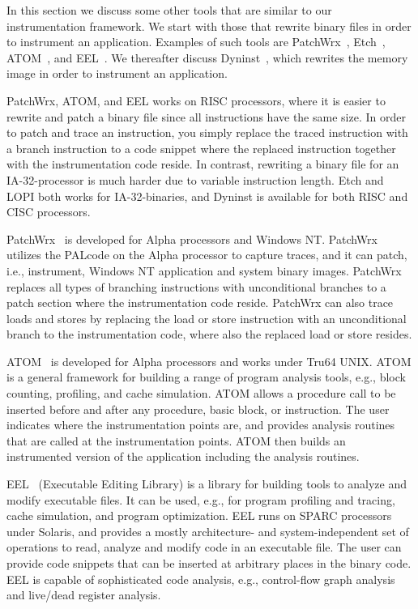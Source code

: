 \label{sec:lopi:related_work}
In this section we discuss some other tools that are similar to our
instrumentation framework. We start with those that rewrite binary files in
order to instrument an application. Examples of such tools are
PatchWrx~\cite{casmira98tcw}, Etch~\cite{etch}, ATOM~\cite{atom}, and
EEL~\cite{eel}. We thereafter discuss Dyninst~\cite{buck00dyninst, paradyn95},
which rewrites the memory image in order to instrument an application.

PatchWrx, ATOM, and EEL works on RISC processors, where it is easier to
rewrite and patch a binary file since all instructions have the same size. In
order to patch and trace an instruction, you simply replace the traced
instruction with a branch instruction to a code snippet where the replaced
instruction together with the instrumentation code reside. In contrast,
rewriting a binary file for an IA-32-processor is much harder due to variable
instruction length. Etch and LOPI both works for IA-32-binaries, and Dyninst
is available for both RISC and CISC processors.

PatchWrx~\cite{casmira98tcw} is developed for Alpha processors and Windows
NT. PatchWrx utilizes the PALcode on the Alpha processor to capture traces,
and it can patch, i.e., instrument, Windows NT application and system binary
images. PatchWrx replaces all types of branching instructions with
unconditional branches to a patch section where the instrumentation code
reside. PatchWrx can also trace loads and stores by replacing the load or
store instruction with an unconditional branch to the instrumentation code,
where also the replaced load or store resides.

ATOM~\cite{atom} is developed for Alpha processors and works under Tru64 UNIX.
ATOM is a general framework for building a range of program analysis tools,
e.g., block counting, profiling, and cache simulation. ATOM allows a procedure
call to be inserted before and after any procedure, basic block, or
instruction. The user indicates where the instrumentation points are, and
provides analysis routines that are called at the instrumentation points.
ATOM then builds an instrumented version of the application including the
analysis routines.

EEL~\cite{eel} (Executable Editing Library) is a library for building tools to
analyze and modify executable files. It can be used, e.g., for program
profiling and tracing, cache simulation, and program optimization. EEL runs on
SPARC processors under Solaris, and provides a mostly architecture- and
system-independent set of operations to read, analyze and modify code in an
executable file.  The user can provide code snippets that can be inserted at
arbitrary places in the binary code. EEL is capable of sophisticated code
analysis, e.g., control-flow graph analysis and live/dead register analysis.

